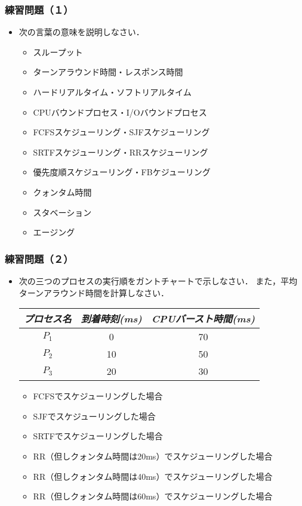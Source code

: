 \documentclass[unicode]{beamer}                   %
\begin{document}
\begin{frame}
  \frametitle{練習問題（１）}
  \begin{itemize}
  \item 次の言葉の意味を説明しなさい．
    \begin{itemize}
    \item スループット
    \item ターンアラウンド時間・レスポンス時間
    \item ハードリアルタイム・ソフトリアルタイム
    \item CPUバウンドプロセス・I/Oバウンドプロセス
    \item FCFSスケジューリング・SJFスケジューリング
    \item SRTFスケジューリング・RRスケジューリング
    \item 優先度順スケジューリング・FBケジューリング
    \item クォンタム時間
    \item スタベーション
    \item エージング
    \end{itemize}
  \end{itemize}
  \vfill
\end{frame}

\begin{frame}
  \frametitle{練習問題（２）}
  \begin{itemize}
  \item 次の三つのプロセスの実行順をガントチャートで示しなさい．
    また，平均ターンアラウンド時間を計算しなさい．
    \vfill
    \begin{center}
      \begin{tabular}{c c c}
        \emph{プロセス名} & \emph{到着時刻(ms)} &
        \emph{CPUバースト時間(ms)} \\\hline
        $P_1$  & 0  & 70 \\
        $P_2$  & 10 & 50 \\
        $P_3$  & 20 & 30
      \end{tabular}
    \end{center}
    \vfill
    \begin{itemize}
    \item FCFSでスケジューリングした場合
    \item SJFでスケジューリングした場合
    \item SRTFでスケジューリングした場合
    \item RR（但しクォンタム時間は20ms）でスケジューリングした場合
    \item RR（但しクォンタム時間は40ms）でスケジューリングした場合
    \item RR（但しクォンタム時間は60ms）でスケジューリングした場合
    \end{itemize}
  \end{itemize}
  \vfill
\end{frame}
\end{document}
